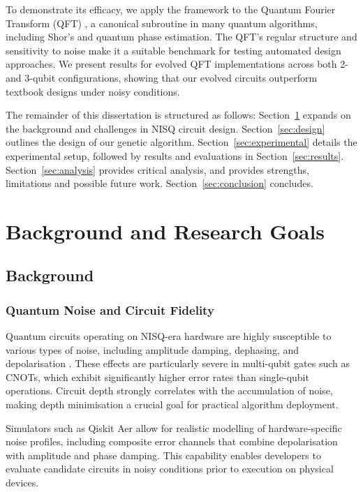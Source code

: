 \documentclass[11pt,a4paper]{article}
\begin{document}
To demonstrate its efficacy, we apply the framework to the Quantum Fourier Transform (QFT) \cite{Jozsa1997QuantumAA}, a canonical subroutine in many quantum algorithms, including Shor’s and quantum phase estimation. The QFT’s regular structure and sensitivity to noise make it a suitable benchmark for testing automated design approaches. We present results for evolved QFT implementations across both 2- and 3-qubit configurations, showing that our evolved circuits outperform textbook designs under noisy conditions.\newline

The remainder of this dissertation is structured as follows: Section~\ref{sec:background} expands on the background and challenges in NISQ circuit design. Section~\ref{sec:design} outlines the design of our genetic algorithm. Section~\ref{sec:experimental} details the experimental setup, followed by results and evaluations in Section~\ref{sec:results}. Section~\ref{sec:analysis} provides critical analysis, and provides strengths, limitations and possible future work. Section~\ref{sec:conclusion} concludes.

%
%
\section{Background and Research Goals} \label{sec:background}
\subsection{Background}
\subsubsection*{Quantum Noise and Circuit Fidelity}
Quantum circuits operating on NISQ-era hardware are highly susceptible to various types of noise, including amplitude damping, dephasing, and depolarisation \cite{Clerk2008IntroductionTQ}. These effects are particularly severe in multi-qubit gates such as CNOTs, which exhibit significantly higher error rates than single-qubit operations. Circuit depth strongly correlates with the accumulation of noise, making depth minimisation a crucial goal for practical algorithm deployment.\newline

Simulators such as Qiskit Aer \cite{ibm_qiskit_aer} allow for realistic modelling of hardware-specific noise profiles, including composite error channels that combine depolarisation with amplitude and phase damping. This capability enables developers to evaluate candidate circuits in noisy conditions prior to execution on physical devices.
\end{document}
